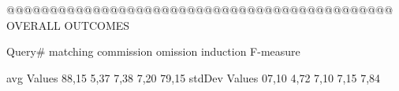  @@@@@@@@@@@@@@@@@@@@@@@@@@@@@@@@@@@@@@@@@@@@@ OVERALL OUTCOMES

    Query#   matching commission   omission  induction  F-measure

avg Values      88,15    5,37       7,38       7,20       79,15       
stdDev Values   07,10    4,72        7,10      7,15        7,84       
